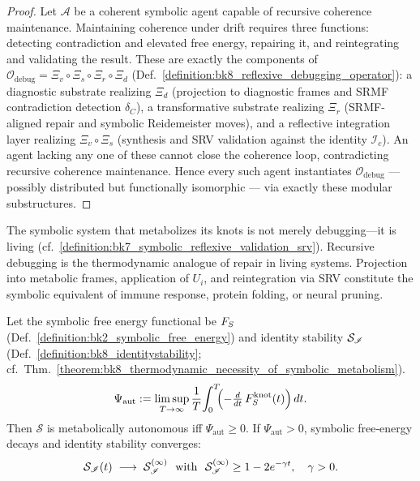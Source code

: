 \begin{proof}
\label{proof:bk8_symbolic_agents_as_projections}
\leavevmode
Let $\mathscr{A}$ be a coherent symbolic agent capable of recursive coherence maintenance. Maintaining coherence under drift requires three functions: detecting contradiction and elevated free energy, repairing it, and reintegrating and validating the result. These are exactly the components of $\mathcal{O}_{\mathrm{debug}}=\Xi_v\circ\Xi_s\circ\Xi_r\circ\Xi_d$ (Def.~\ref{definition:bk8_reflexive_debugging_operator}): a diagnostic substrate realizing $\Xi_d$ (projection to diagnostic frames and SRMF contradiction detection $\delta_C$), a transformative substrate realizing $\Xi_r$ (SRMF-aligned repair and symbolic Reidemeister moves), and a reflective integration layer realizing $\Xi_v\circ\Xi_s$ (synthesis and SRV validation against the identity $\mathscr{I}_c$). An agent lacking any one of these cannot close the coherence loop, contradicting recursive coherence maintenance. Hence every such agent instantiates $\mathcal{O}_{\mathrm{debug}}$ --- possibly distributed but functionally isomorphic --- via exactly these modular substructures.
\end{proof}
\begin{scholium}
\label{scholium:bk8_symbolic_debugging_as_metabolic_repair}
The symbolic system that metabolizes its knots is not merely debugging—it is living (cf.~\ref{definition:bk7_symbolic_reflexive_validation_srv}). Recursive debugging is the thermodynamic analogue of repair in living systems. Projection into metabolic frames, application of $U_i$, and reintegration via SRV constitute the symbolic equivalent of immune response, protein folding, or neural pruning.
\end{scholium}
\begin{theorem}
\label{theorem:bk8_threshold_of_metabolic_autonomy}
Let the symbolic free energy functional be $F_S$ (Def.~\ref{definition:bk2_symbolic_free_energy}) and identity stability $\mathcal{S}_{\mathscr{I}}$ (Def.~\ref{definition:bk8_identitystability}; cf.~Thm.~\ref{theorem:bk8_thermodynamic_necessity_of_symbolic_metabolism}).
\[
\Psi_{\mathrm{aut}}
   := \limsup_{T\to\infty}
      \frac{1}{T}\!\int_0^T\!\!
      \Bigl(-\tfrac{d}{dt}\,F_S^{\text{knot}}(t)\Bigr)\,dt.
\]
Then $\mathcal{S}$ is metabolically autonomous iff $\Psi_{\mathrm{aut}}\ge 0$.
If $\Psi_{\mathrm{aut}}>0$, symbolic free‑energy decays and identity
stability converges:
\[
\identitystability(t)\;\longrightarrow\;
\identitystability^{(\infty)}
\ \text{ with }\ 
\identitystability^{(\infty)} \ge 1 - 2 e^{-\gamma t},
\quad \gamma>0.
\]
\end{theorem}
